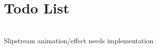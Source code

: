 \chapter{Todo List }
\hypertarget{todo}{}\label{todo}

\begin{DoxyRefList}
\item[{\parbox[t]{\linewidth}{Member \doxylink{class_climbing_turn_activity_ac9405e13f7495eb1d62ef126cd4eebe6}{Climbing\+Turn\+Activity.Handle\+Slip\+Stream} ()}}]\hfill \\
\label{todo__todo000001}%
%
Slipstream animation/effect needs implementation 
\end{DoxyRefList}